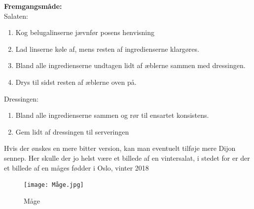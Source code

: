 \documentclass{book}
\begin{document}
\begin{minipage}[t]{0.5\textwidth} 
\textbf{Fremgangsmåde:}
\\ Salaten:
\begin{enumerate}
    \item Kog belugalinserne jævnfør posens henvisning
    \item Lad linserne køle af, mens resten af ingredienserne klargøres.
    \item Bland alle ingredienserne undtagen lidt af æblerne sammen med dressingen.
    \item Drys til sidst resten af æblerne oven på.
\end{enumerate}
Dressingen:
\begin{enumerate}
    \item Bland alle ingredienserne sammen og rør til ensartet konsistens.
    \item Gem lidt af dressingen til serveringen
\end{enumerate}
\end{minipage}
Hvis der ønskes en mere bitter version, kan man eventuelt tilføje mere Dijon sennep.
\newpage  Her skulle der jo helst være et billede af en vintersalat, i stedet for er der et billede af en måges fødder i Oslo, vinter 2018
\begin{figure}
    \centering
    \texttt{[image: Måge.jpg]}
    \caption{Måge}
    
\end{figure}
\end{document}
